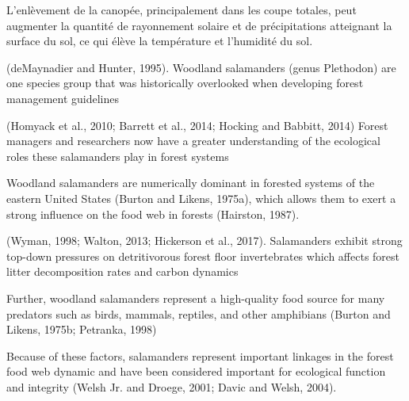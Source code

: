 L'enlèvement de la canopée, principalement dans les coupe totales, peut augmenter la quantité de rayonnement solaire et de précipitations atteignant la surface du sol, ce qui élève la température et l'humidité du sol.

(deMaynadier and Hunter, 1995). Woodland salamanders (genus Plethodon) are one species group that was historically overlooked when developing forest management guidelines 


(Homyack et al., 2010; Barrett et al., 2014; Hocking and Babbitt, 2014) Forest managers and researchers now have a greater understanding of the ecological roles these salamanders play in forest systems 

Woodland salamanders are numerically dominant in forested systems of the eastern United States (Burton and Likens, 1975a), which allows them to exert a strong influence on the food web in forests (Hairston, 1987).

(Wyman, 1998; Walton, 2013; Hickerson et al., 2017). Salamanders exhibit strong top-down pressures on detritivorous forest floor invertebrates which affects forest litter decomposition rates and carbon dynamics 

Further, woodland salamanders represent a high-quality food source for many predators such as birds, mammals, reptiles, and other amphibians (Burton and Likens, 1975b; Petranka, 1998)

Because of these factors, salamanders represent important linkages in the forest food web dynamic and have been considered important for ecological function and integrity (Welsh Jr. and Droege, 2001; Davic and Welsh, 2004).

